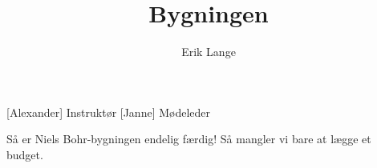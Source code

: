 \documentclass[a4paper,11pt]{article}
\title{Bygningen}
\author{Erik Lange}
\begin{document}
	\maketitle
	
	\begin{roles}
		[Alexander] Instruktør
		[Janne] Mødeleder
	\end{roles}
	
	\begin{props}
	\end{props}
	
	
	\begin{sketch}
		
		
		 Så er Niels Bohr-bygningen endelig færdig!  Så mangler vi bare at lægge et budget.
		
		
		
	\end{sketch}
\end{document}
